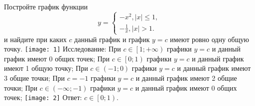 \documentclass{article}
\begin{document}
	Постройте график функции\newline
	$$
		y =
		\begin{cases}
			-x^2, |x| \leq 1, \\
			-\frac{1}{x}, |x| > 1.
		\end{cases}
	$$
	\newline и найдите при каких $c$ данный график и график $ y = c $ имеют
	ровно одну общую точку.
	\newline\texttt{[image: 1]} \newline
	Исследование:
	\newline\space При $c \in \left[ 1; +\infty \right)$ графики 
	$ y = c $ и данный график имеют 0 общих точек;
	\newline\space При $c \in \left[ 0; 1 \right)$ графики $ y = c $
	и данный график имеют 1 общую точку;
	\newline\space При $c \in \left( -1; 0 \right)$ графики $ y = c $
	и данный график имеют 3 общие точки;
	\newline\space При $c = -1$ графики $ y = c $
	и данный график имеют 2 общие точки;
	\newline\space При $c \in \left( -\infty; -1 \right)$ графики 
	$ y = c $ и данный график имеют 0 общих точек;
	\newline\texttt{[image: 2]}
	\newline Ответ: $ c \in \left[ 0; 1 \right) $.
	
\end{document}
